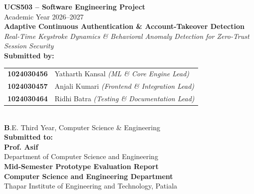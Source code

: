 \documentclass[12pt, a4paper, oneside]{report}
\begin{document}
\begin{titlepage}
    \centering
    \vspace*{0.5cm}
    
    {\Large\bfseries UCS503 -- Software Engineering Project}\\[0.3cm]
    {\large Academic Year 2026--2027}\\[1.5cm]
    
    {\Huge\bfseries Adaptive Continuous Authentication \& Account-Takeover Detection}\\[0.4cm]
    {\large\textit{Real-Time Keystroke Dynamics \& Behavioral Anomaly Detection for Zero-Trust Session Security}}\\[2.0cm]
    
    {\large\textbf{Submitted by:}}\\[0.3cm]
    \begin{tabular}{ll}
        \textbf{1024030456} & Yatharth Kansal \textit{(ML \& Core Engine Lead)} \\
        \textbf{1024030457} & Anjali Kumari \textit{(Frontend \& Integration Lead)} \\
        \textbf{1024030464} & Ridhi Batra \textit{(Testing \& Documentation Lead)} \\
    \end{tabular}\\[0.5cm]
    {\normalsize\textbf B.E. Third Year, Computer Science \& Engineering}\\[1.6cm]
    
    {\large\textbf{Submitted to:}}\\[0.2cm]
    {\large\textbf{Prof. Asif}}\\[0.1cm]
    {\normalsize Department of Computer Science and Engineering}\\[1.2cm]
    
    \vfill
    {\normalsize\textbf{Mid-Semester Prototype Evaluation Report}}\\[0.15cm]
    {\normalsize\textbf{Computer Science and Engineering Department}}\\[0.1cm]
    {\normalsize Thapar Institute of Engineering and Technology, Patiala}\\[0.4cm]
\end{titlepage}

\tableofcontents
\newpage
{}
\end{document}
